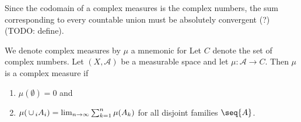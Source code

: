 Since the codomain of
a complex measures is
the complex numbers,
the sum corresponding
to every countable union
must be absolutely convergent (?)
(TODO: define).


We denote complex measures by $\mu$
a mnemonic for 
Let $C$ denote the set
of complex numbers.
Let
$(X, \mathcal{A})$
be a measurable space
and let
$\mu: \mathcal{A} \to C$.
Then $\mu$ is a complex measure if
\begin{enumerate}
  \item $\mu(\emptyset) = 0$ and
  \item
  $\mu(\,\cup\,_{i} A_i) =
    \lim_{n \to \infty}
      \sum_{k = 1}^{n} \mu(A_k)$
  for all disjoint families $\seq{A}$.
\end{enumerate}
\strats
